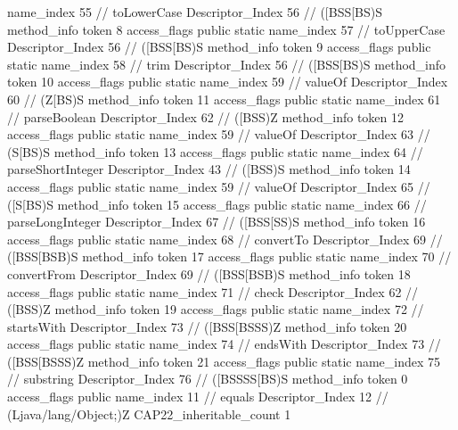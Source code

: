 {{{{{					name_index	55		// toLowerCase
					Descriptor_Index	56		// ([BSS[BS)S
				}
				method_info {
					token	8
					access_flags	public static
					name_index	57		// toUpperCase
					Descriptor_Index	56		// ([BSS[BS)S
				}
				method_info {
					token	9
					access_flags	public static
					name_index	58		// trim
					Descriptor_Index	56		// ([BSS[BS)S
				}
				method_info {
					token	10
					access_flags	public static
					name_index	59		// valueOf
					Descriptor_Index	60		// (Z[BS)S
				}
				method_info {
					token	11
					access_flags	public static
					name_index	61		// parseBoolean
					Descriptor_Index	62		// ([BSS)Z
				}
				method_info {
					token	12
					access_flags	public static
					name_index	59		// valueOf
					Descriptor_Index	63		// (S[BS)S
				}
				method_info {
					token	13
					access_flags	public static
					name_index	64		// parseShortInteger
					Descriptor_Index	43		// ([BSS)S
				}
				method_info {
					token	14
					access_flags	public static
					name_index	59		// valueOf
					Descriptor_Index	65		// ([S[BS)S
				}
				method_info {
					token	15
					access_flags	public static
					name_index	66		// parseLongInteger
					Descriptor_Index	67		// ([BSS[SS)S
				}
				method_info {
					token	16
					access_flags	public static
					name_index	68		// convertTo
					Descriptor_Index	69		// ([BSS[BSB)S
				}
				method_info {
					token	17
					access_flags	public static
					name_index	70		// convertFrom
					Descriptor_Index	69		// ([BSS[BSB)S
				}
				method_info {
					token	18
					access_flags	public static
					name_index	71		// check
					Descriptor_Index	62		// ([BSS)Z
				}
				method_info {
					token	19
					access_flags	public static
					name_index	72		// startsWith
					Descriptor_Index	73		// ([BSS[BSSS)Z
				}
				method_info {
					token	20
					access_flags	public static
					name_index	74		// endsWith
					Descriptor_Index	73		// ([BSS[BSSS)Z
				}
				method_info {
					token	21
					access_flags	public static
					name_index	75		// substring
					Descriptor_Index	76		// ([BSSSS[BS)S
				}
				method_info {
					token	0
					access_flags	public
					name_index	11		// equals
					Descriptor_Index	12		// (Ljava/lang/Object;)Z
				}
			}
			CAP22_inheritable_count	1
		}
	}
}
